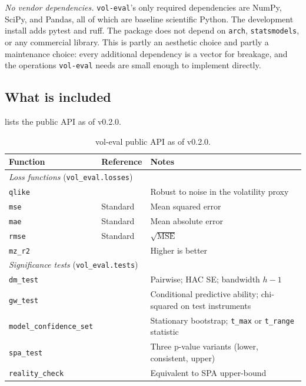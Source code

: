 \textit{No vendor dependencies.} \texttt{vol-eval}'s only required dependencies are NumPy, SciPy, and Pandas, all of which are baseline scientific Python. The development install adds pytest and ruff. The package does not depend on \texttt{arch}, \texttt{statsmodels}, or any commercial library. This is partly an aesthetic choice and partly a maintenance choice: every additional dependency is a vector for breakage, and the operations \texttt{vol-eval} needs are small enough to implement directly.

\subsection{What is included}

 lists the public API as of v0.2.0.

\begin{table}[H]
\centering
\caption{vol-eval public API as of v0.2.0.}
\label{tab:api}
\footnotesize
\setlength{\tabcolsep}{4pt}
\begin{tabular}{@{}l l p{6.2cm}@{}}
\toprule
\textbf{Function} & \textbf{Reference} & \textbf{Notes} \\
\midrule
\multicolumn{3}{l}{\emph{Loss functions} (\texttt{vol\_eval.losses})} \\
\texttt{qlike} & \citet{Patton2011} & Robust to noise in the volatility proxy \\
\texttt{mse}   & Standard           & Mean squared error \\
\texttt{mae}   & Standard           & Mean absolute error \\
\texttt{rmse}  & Standard           & $\sqrt{\text{MSE}}$ \\
\texttt{mz\_r2} & \citet{MincerZarnowitz1969} & Higher is better \\
\midrule
\multicolumn{3}{l}{\emph{Significance tests} (\texttt{vol\_eval.tests})} \\
\texttt{dm\_test}              & \citet{DieboldMariano1995} & Pairwise; HAC SE; bandwidth $h{-}1$ \\
\texttt{gw\_test}              & \citet{GiacominiWhite2006} & Conditional predictive ability; chi-squared on test instruments \\
\texttt{model\_confidence\_set} & \citet{HansenLundeNason2011} & Stationary bootstrap; \texttt{t\_max} or \texttt{t\_range} statistic \\
\texttt{spa\_test}             & \citet{Hansen2005} & Three p-value variants (lower, consistent, upper) \\
\texttt{reality\_check}        & \citet{White2000} & Equivalent to SPA upper-bound \\
\bottomrule
\end{tabular}
\end{table}

